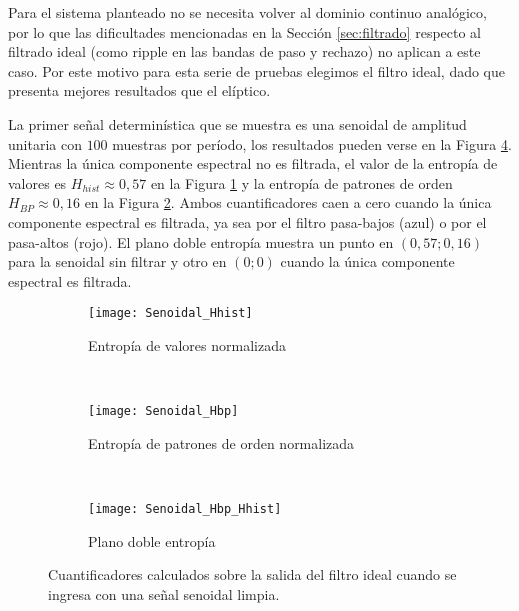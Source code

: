 Para el sistema planteado no se necesita volver al dominio continuo analógico, por lo que las dificultades mencionadas en la Sección \ref{sec:filtrado} respecto al filtrado ideal (como ripple en las bandas de paso y rechazo) no aplican a este caso.
Por este motivo para esta serie de pruebas elegimos el filtro ideal, dado que presenta mejores resultados que el elíptico.

La primer señal determinística que se muestra es una senoidal de amplitud unitaria con $100$ muestras por período, los resultados pueden verse en la Figura \ref{fig:Senoidal}.
Mientras la única componente espectral no es filtrada, el valor de la entropía de valores es $H_{hist}\approx0,57$ en la Figura \ref{subfig:Senoidal_Hhist} y la entropía de patrones de orden $H_{BP}\approx0,16$ en la Figura \ref{subfig:Senoidal_Hbp}.
Ambos cuantificadores caen a cero cuando la única componente espectral es filtrada, ya sea por el filtro pasa-bajos (azul) o por el pasa-altos (rojo).
El plano doble entropía muestra un punto en $\left(0,57;0,16\right)$ para la senoidal sin filtrar y otro en $\left(0;0\right)$ cuando la única componente espectral es filtrada.
%
\begin{figure}[h]
    \centering
    \begin{subfigure}[t]{.49\textwidth}
        \texttt{[image: Senoidal\_Hhist]}
        \caption{Entropía de valores normalizada}
        \label{subfig:Senoidal_Hhist}
    \end{subfigure}
    ~ %
    \begin{subfigure}[t]{.49\textwidth}
        \texttt{[image: Senoidal\_Hbp]}
        \caption{Entropía de patrones de orden normalizada}
        \label{subfig:Senoidal_Hbp}
    \end{subfigure}
    ~ %
    \begin{subfigure}[t]{.49\textwidth}
        \texttt{[image: Senoidal\_Hbp\_Hhist]}
        \caption{Plano doble entropía}
        \label{subfig:Senoidal_HbpHhist}
    \end{subfigure}
    \caption{Cuantificadores calculados sobre la salida del filtro ideal cuando se ingresa con una señal senoidal limpia.}\label{fig:Senoidal}
\end{figure}

